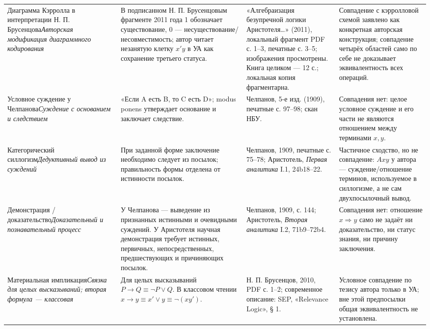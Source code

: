 \documentclass[12pt,a4paper]{article}
\begin{document}
{\begin{longtable}{P{0.18\textwidth}P{0.28\textwidth}P{0.18\textwidth}P{0.23\textwidth}}
Диаграмма Кэрролла в интерпретации Н. П. Брусенцова\newline\emph{Авторская модификация диаграммного кодирования} & В подписанном Н. П. Брусенцовым фрагменте 2011 года 1 обозначает существование, 0 — несуществование/несовместимость; автор читает незанятую клетку \(x'y\) в УА как сохранение третьего статуса. & «Алгебраизация безупречной логики Аристотеля…» (2011), локальный фрагмент PDF с. 1–3, печатные с. 3–5; изображения просмотрены. Книга целиком — 12 с.; локальная копия фрагментарна. & Совпадение с кэрролловой схемой заявлено как конкретная авторская конструкция; совпадение четырёх областей само по себе не доказывает эквивалентность всех операций. \\
Условное суждение у Челпанова\newline\emph{Суждение с основанием и следствием} & «Если A есть B, то C есть D»; modus ponens утверждает основание и заключает следствие. & Челпанов, 5-е изд. (1909), печатные с. 97–98; скан НБУ. & Совпадения нет: целое условное суждение и его части не являются отношением между терминами \(x,y\). \\
Категорический силлогизм\newline\emph{Дедуктивный вывод из суждений} & При заданной форме заключение необходимо следует из посылок; правильность формы отделена от истинности посылок. & Челпанов, 1909, печатные с. 75–78; Аристотель, \emph{Первая аналитика} I.1, 24b18–22. & Частичное сходство, но не совпадение: \(Axy\) у автора — суждение/отношение терминов, используемое в силлогизме, а не сам двухпосылочный вывод. \\
Демонстрация / доказательство\newline\emph{Доказательный и познавательный процесс} & У Челпанова — выведение из признанных истинными и очевидными суждений. У Аристотеля научная демонстрация требует истинных, первичных, непосредственных, предшествующих и причиняющих посылок. & Челпанов, 1909, с. 144; Аристотель, \emph{Вторая аналитика} I.2, 71b9–72b4. & Совпадения нет: отношение \(x\Rightarrow y\) само не задаёт ни доказательство, ни статус знания, ни причину заключения. \\
Материальная импликация\newline\emph{Связка для целых высказываний; вторая формула — классовая} & Для целых высказываний \(P\to Q\equiv\neg P\lor Q\). В классовом чтении \(x\to y\equiv x'\lor y\equiv\neg(xy')\). & Н. П. Брусенцов, 2010, PDF с. 1–2; современное описание: SEP, «Relevance Logic», § 1. & Условное совпадение по тезису автора только в УА; вне этой предпосылки общая эквивалентность не установлена. \\

\end{longtable}}
\end{document}
